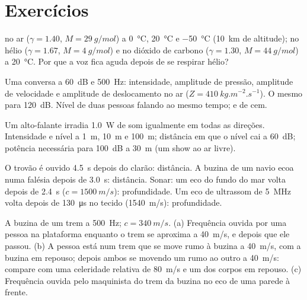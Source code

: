 \section{Exercícios}

\begin{exercise}[$\star$]\label{exo:b2:sound-waves:1}
 no ar ($\gamma = 1.40$, $M = \qty{29}{g/mol}$) a
\qty{0}{\degreeCelsius}, \qty{20}{\degreeCelsius} e \qty{-50}{\degreeCelsius}
(\qty{10}{km} de altitude); no hélio ($\gamma = 1.67$, $M = \qty{4}{g/mol}$) e no
dióxido de carbono ($\gamma = 1.30$, $M = \qty{44}{g/mol}$) a \qty{20}{\degreeCelsius}.
Por que a voz fica aguda depois de se respirar hélio?
\end{exercise}

\begin{exercise}[$\star$]\label{exo:b2:sound-waves:2}
Uma conversa a \qty{60}{dB} e \qty{500}{Hz}: intensidade, amplitude de
pressão, amplitude de velocidade e amplitude de deslocamento no ar
($Z = \qty{410}{kg.m^{-2}.s^{-1}}$). O mesmo para \qty{120}{dB}. Nível de duas
pessoas falando ao mesmo tempo; e de cem.
\end{exercise}

\begin{exercise}[$\star$]\label{exo:b2:sound-waves:3}
Um alto-falante irradia \qty{1.0}{W} de som igualmente em todas as direções.
Intensidade e nível a \qty{1}{m}, \qty{10}{m} e \qty{100}{m}; distância em que
o nível cai a \qty{60}{dB}; potência necessária para \qty{100}{dB} a \qty{30}{m}
(um show ao ar livre).
\end{exercise}

\begin{exercise}[$\star$]\label{exo:b2:sound-waves:4}
O trovão é ouvido \qty{4.5}{s} depois do clarão: distância. A buzina de um navio
ecoa numa falésia depois de \qty{3.0}{s}: distância. Sonar: um eco do
fundo do mar volta depois de \qty{2.4}{s} ($c = \qty{1500}{m/s}$): profundidade. Um
eco de ultrassom de \qty{5}{MHz} volta depois de \qty{130}{\micro s} no tecido
(\qty{1540}{m/s}): profundidade.
\end{exercise}

\begin{exercise}[$\star\star$]\label{exo:b2:sound-waves:5}
A buzina de um trem a \qty{500}{Hz}; $c = \qty{340}{m/s}$. (a) Frequência ouvida por uma
pessoa na plataforma enquanto o trem se aproxima a \qty{40}{m/s}, e
depois que ele passou. (b) A pessoa está num trem que se move rumo à
buzina a \qty{40}{m/s}, com a buzina em repouso; depois ambos se movendo um rumo ao
outro a \qty{40}{m/s}: compare com uma celeridade relativa de \qty{80}{m/s} e
um dos corpos em repouso. (c) Frequência ouvida pelo maquinista do trem da buzina
no eco de uma parede à frente.
\end{exercise}


